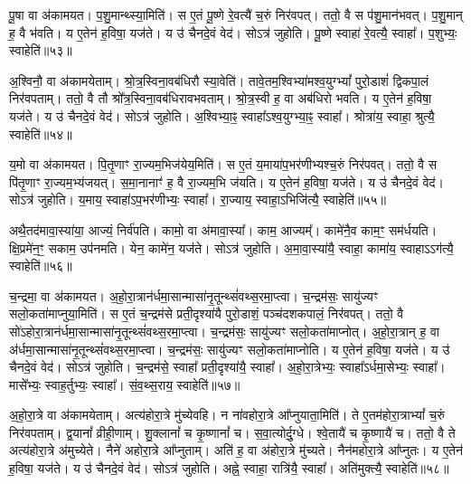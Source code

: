 पू॒षा वा अ॑कामयत।
प॒शु॒मान्थ्स्या॒मिति॑।
स ए॒तं पू॒ष्णे रे॒वत्यै॑ च॒रुं निर॑वपत्।
ततो॒ वै स प॑शु॒मान॑भवत्।
प॒शु॒मान् ह॒ वै भ॑वति।
य ए॒तेन॑ ह॒विषा॒ यज॑ते।
य उ॑ चैनदे॒वं वेद॑।
सोऽत्र॑ जुहोति।
पू॒ष्णे स्वाहा॑ रे॒वत्यै॒ स्वाहा᳚।
प॒शुभ्यः॒ स्वाहेति॑॥५३॥

अ॒श्विनौ॒ वा अ॑कामयेताम्।
श्रो॒त्र॒स्विना॒वब॑धिरौ स्या॒वेति॑।
तावे॒तम॒श्विभ्या॑मश्व॒युग्भ्यां᳚ पुरो॒डाशं॑ द्विकपा॒लं निर॑वपताम्।
ततो॒ वै तौ श्रो᳚त्र॒स्विना॒वब॑धिरावभवताम्।
श्रो॒त्र॒स्वी ह॒ वा अब॑धिरो भवति।
य ए॒तेन॑ ह॒विषा॒ यज॑ते।
य उ॑ चैनदे॒वं वेद॑।
सोऽत्र॑ जुहोति।
अ॒श्विभ्या॒ꣴ॒ स्वाहा᳚\-ऽश्व॒युग्भ्या॒ꣴ॒ स्वाहा᳚।
श्रोत्रा॑य॒ स्वाहा॒ श्रुत्यै॒ स्वाहेति॑॥५४॥

य॒मो वा अ॑कामयत।
पि॒तृ॒णाꣳ रा॒ज्यम॒भिज॑येय॒मिति॑।
स ए॒तं य॒माया॑प॒भर॑णीभ्यश्च॒रुं निर॑पवत्।
ततो॒ वै स पि॑तृ॒णाꣳ रा॒ज्य\-म॒भ्य॑जयत्।
स॒मा॒नानाꣳ॑ ह॒ वै रा॒ज्यम॒भि ज॑यति।
य ए॒तेन॑ ह॒विषा॒ यज॑ते।
य उ॑ चैनदे॒वं वेद॑।
सोऽत्र॑ जुहोति।
य॒माय॒ स्वाहा॑\-ऽप॒भर॑णीभ्यः॒ स्वाहा᳚।
रा॒ज्याय॒ स्वाहा॒ऽभिजि॑त्यै॒ स्वाहेति॑॥५५॥

अथै॒तद॑मावा॒स्या॑या॒ आज्यं॒ निर्व॑पति।
कामो॒ वा अ॑मावा॒स्या᳚।
काम॒ आज्यम्᳚।
कामे॑नै॒व काम॒ꣳ॒ सम॑र्धयति।
क्षि॒प्रमे॑न॒ꣳ॒ सकाम॒ उप॑नमति।
येन॒ कामे॑न॒ यज॑ते।
सोऽत्र॑ जुहोति।
अ॒मा॒वा॒स्या॑यै॒ स्वाहा॒ कामा॑य॒ स्वाहा\-ऽऽग॑त्यै॒ स्वाहेति॑॥५६॥\anuvakamend[मि॒त्र इन्द्रः॑ प्र॒जा\-प॑ति॒र्दश॑ द॒शाप॒ एका॑दश॒ विश्वे॒ ब्रह्म॒ दश॑दश॒ विष्णु॒स्त्रयो॑दश॒ वस॑व॒ इन्द्रो॒\-ऽजो\-ऽहि॒र्वै बु॒ध्नियः॑ पू॒षा\-ऽश्विनौ॑ य॒मो दश॑ द॒शाथै॒तद॑मावा॒स्या॑या अ॒ष्टौ पञ्च॑दश]

च॒न्द्रमा॒ वा अ॑कामयत।
अ॒हो॒रा॒त्रान॑र्धमा॒सान्मासा॑नृ॒तून्थ्सं॑\-वथ्स॒रमा॒प्त्वा।
च॒न्द्रम॑सः॒ सायु॑ज्यꣳ सलो॒कता॑माप्नुया॒मिति॑।
स ए॒तं च॒न्द्रम॑से प्रती॒दृश्या॑यै पुरो॒डाशं॒ पञ्च॑\-दश\-कपालं॒ निर॑वपत्।
ततो॒ वै सो॑\-ऽहोरा॒त्रान॑र्ध\-मा॒सान्मासा॑\-नृ॒तून्थ्सं॑वथ्स॒र\-मा॒प्त्वा।
च॒न्द्रम॑सः॒ सायु॑ज्यꣳ सलो॒कता॑माप्नोत्।
अ॒हो॒रा॒त्रान् ह॒ वा अ॑र्ध\-मा॒सान्मासा॑\-नृ॒तून्थ्सं॑वथ्स॒र\-मा॒प्त्वा।
च॒न्द्रम॑सः॒ सायु॑ज्यꣳ सलो॒कता॑\-माप्नोति।
य ए॒तेन॑ ह॒विषा॒ यज॑ते।
य उ॑ चैनदे॒वं वेद॑।
सोऽत्र॑ जुहोति।
च॒न्द्रम॑से॒ स्वाहा᳚ प्रती॒दृश्या॑यै॒ स्वाहा᳚।
अ॒हो॒रा॒त्रेभ्यः॒ स्वाहा᳚\-ऽर्धमा॒सेभ्यः॒ स्वाहा᳚।
मासे᳚भ्यः॒ स्वाह॒र्तुभ्यः॒ स्वाहा᳚।
सं॒व॒थ्स॒राय॒ स्वाहेति॑॥५७॥

अ॒हो॒रा॒त्रे वा अ॑कामयेताम्।
अत्य॑होरा॒त्रे मु॑च्येवहि।
न ना॑वहोरा॒त्रे आ᳚प्नुयाता॒मिति॑।
ते ए॒तम॑होरा॒त्राभ्यां᳚ च॒रुं निर॑वपताम्।
द्व॒यानां᳚ व्रीही॒णाम्।
शु॒क्लानां᳚ च कृ॒ष्णानां᳚ च।
स॒वा॒त्योर्दु॒ग्धे।
श्वे॒तायै॑ च कृ॒ष्णायै॑ च।
ततो॒ वै ते अत्य॑होरा॒त्रे अ॑मुच्येते।
नैने॑ अहोरा॒त्रे आ᳚प्नुताम्।
अति॑ ह॒ वा अ॑होरा॒त्रे मु॑च्यते।
नैन॑महोरा॒त्रे आ᳚प्नुतः।
य ए॒तेन॑ ह॒विषा॒ यज॑ते।
य उ॑ चैनदे॒वं वेद॑।
सोऽत्र॑ जुहोति।
अह्ने॒ स्वाहा॒ रात्रि॑यै॒ स्वाहा᳚।
अति॑मुक्त्यै॒ स्वाहेति॑॥५८॥


